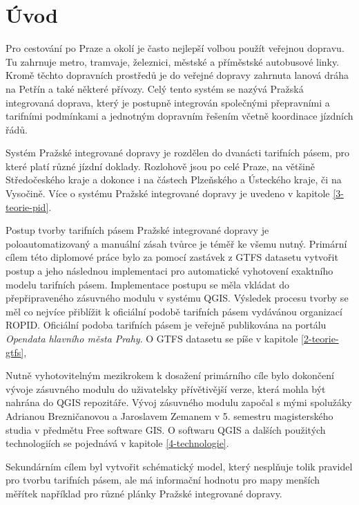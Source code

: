 \chapter*{Úvod}
\label{0-uvod}

Pro cestování po Praze a okolí je často nejlepší volbou použít veřejnou dopravu.
Tu zahrnuje metro, tramvaje, železnici, městské a příměstské autobusové linky.
Kromě těchto dopravních prostředů je do veřejné dopravy zahrnuta lanová dráha na Petřín a také některé přívozy. 
Celý tento systém se nazývá Pražská integrovaná doprava, který je postupně integrován společnými přepravními
a tarifními podmínkami a jednotným dopravním řešením včetně koordinace jízdních řádů.

Systém Pražské integrované dopravy je rozdělen do dvanácti tarifních pásem, pro
které platí různé jízdní doklady. Rozlohově jsou po celé Praze, na většině
Středočeského kraje a dokonce i na částech Plzeňského a Ústeckého kraje, či na Vysočině.
Více o systému Pražské integrované dopravy je uvedeno v kapitole \ref{3-teorie-pid}.

Postup tvorby tarifních pásem Pražské integrované dopravy je poloautomatizovaný
a manuální zásah tvůrce je téměř ke všemu nutný.
Primární cílem této diplomové práce bylo za pomocí zastávek z GTFS datasetu vytvořit 
postup a jeho následnou implementaci pro automatické vyhotovení exaktního modelu tarifních pásem.
Implementace postupu se měla vkládat do přepřipraveného zásuvného modulu v systému QGIS.
Výsledek procesu tvorby se měl co nejvíce přiblížit k oficiální podobě tarifních pásem
vydávánou organizací ROPID. 
Oficiální podoba tarifních pásem je veřejně publikována na portálu \textit{Opendata hlavního města Prahy}.
O GTFS datasetu se píše v kapitole \ref{2-teorie-gtfs},

Nutně vyhotovitelným mezikrokem k dosažení primárního cíle bylo dokončení
vývoje zásuvného modulu do uživatelsky přívětivější verze, která mohla být nahrána do QGIS repozitáře.
Vývoj zásuvného modulu započal s mými spolužáky Adrianou Brezničanovou a Jaroslavem
Zemanem v 5. semestru magisterského studia v předmětu Free software GIS.
O softwaru QGIS a dalších použitých technologiích se pojednává v kapitole \ref{4-technologie}. 

Sekundárním cílem byl vytvořit schématický model, který nesplňuje tolik
pravidel pro tvorbu tarifních pásem, ale má informační hodnotu pro mapy menších měřítek
například pro různé plánky Pražské integrované dopravy.

